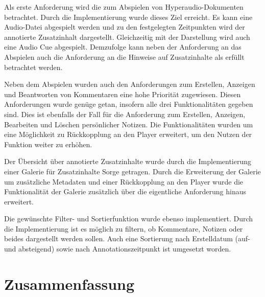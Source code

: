 Als erste Anforderung wird die zum Abspielen von Hyperaudio-Dokumenten betrachtet. Durch die Implementierung wurde dieses Ziel erreicht. Es kann eine Audio-Datei abgespielt werden und zu den festgelegten Zeitpunkten wird der annotierte Zusatzinhalt dargestellt. Gleichzeitig mit der Darstellung wird auch eine Audio Cue abgespielt. Demzufolge kann neben der Anforderung an das Abspielen auch die Anforderung an die Hinweise auf Zusatzinhalte als erfüllt betrachtet werden.

Neben dem Abspielen wurden auch den Anforderungen zum Erstellen, Anzeigen und Beantworten von Kommentaren eine hohe Priorität zugewiesen. Diesen Anforderungen wurde genüge getan, insofern alle drei Funktionalitäten gegeben sind. Dies ist ebenfalls der Fall für die Anforderung zum Erstellen, Anzeigen, Bearbeiten und Löschen persönlicher Notizen. Die Funktionalitäten wurden um eine Möglichkeit zu Rückkopplung an den Player erweitert, um den Nutzen der Funktion weiter zu erhöhen.

Der Übersicht über annotierte Zusatzinhalte wurde durch die Implementierung einer Galerie für Zusatzinhalte Sorge getragen. Durch die Erweiterung der Galerie um zusätzliche Metadaten und einer Rückkopplung an den Player wurde die Funktionalität der Galerie zusätzlich über die eigentliche Anforderung hinaus erweitert.



Die gewünschte Filter- und Sortierfunktion wurde ebenso implementiert. Durch die Implementierung ist es möglich zu filtern, ob Kommentare, Notizen oder beides dargestellt werden sollen. Auch eine Sortierung nach Erstelldatum (auf- und absteigend) sowie nach Annotationszeitpunkt ist umgesetzt worden.




\section{Zusammenfassung}


